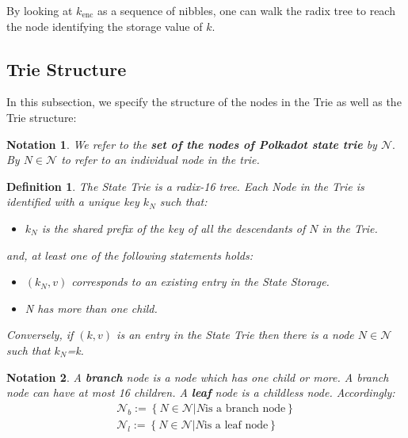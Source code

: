 \documentclass{book}
\newcommand{\assign}{:=}
\newcommand{\tmop}[1]{\ensuremath{\operatorname{#1}}}
\newcommand{\tmstrong}[1]{\textbf{#1}}
\newcommand{\tmtextbf}[1]{{\bfseries{#1}}}
\newcommand{\tmtexttt}[1]{{\ttfamily{#1}}}
\newcommand{\tmverbatim}[1]{{\ttfamily{#1}}}
\newenvironment{itemizeminus}{\begin{itemize} \renewcommand{\labelitemi}{$-$}\renewcommand{\labelitemii}{$-$}\renewcommand{\labelitemiii}{$-$}\renewcommand{\labelitemiv}{$-$}}{\end{itemize}}
\newtheorem{definition}{Definition}
\newtheorem{notation}{Notation}
\providecommand{\tmop}[1]{\ensuremath{\mathrm{#1}}}
\providecommand{\tmstrong}[1]{\tmtextbf{#1}}
\providecommand{\tmtextbf}[1]{\tmtextbf{#1}}
\providecommand{\tmverbatim}[1]{\tmtexttt{#1}}
\newtheorem{definition}{Definition}
\newtheorem{notation}{Notation}
\begin{document}
By looking at $k_{\tmop{enc}}$ as a sequence of nibbles, one can walk the
radix tree to reach the node identifying the storage value of $k$.

\subsection{Trie Structure}\label{sect-state-storage-trie-structure}

In this subsection, we specify the structure of the nodes in the Trie as well
as the Trie structure:

\begin{notation}
  We refer to the {\tmstrong{set of the nodes of Polkadot state trie}} by
  $\mathcal{N}.$ By $N \in \mathcal{N}$ to refer to an individual node in the
  trie.
\end{notation}

\begin{definition}
  \label{defn-nodetype}The State Trie is a radix-16 tree. Each Node in the
  Trie is identified with a unique key $k_N$ such that:
  \begin{itemizeminus}
    \item $k_N$ is the shared prefix of the key of all the descendants of $N$
    in the Trie.
  \end{itemizeminus}
  and, at least one of the following statements holds:
  \begin{itemizeminus}
    \item $(k_N, v)$ corresponds to an existing entry in the State Storage.
    
    \item N has more than one child.
  \end{itemizeminus}
  \tmverbatim{}Conversely, if $(k, v)$ is an entry in the State Trie then
  there is a node $N \in \mathcal{N}$ such that $k_N$=k.
\end{definition}

\begin{notation}
  A {\tmstrong{branch}} node is a node which has one child or more. A branch
  node can have at most 16 children. A {\tmstrong{leaf}} node is a childless
  node. Accordingly:
  \[ \begin{array}{c}
       \mathcal{N}_b \assign \left\{ N \in \mathcal{N}|N \text{is a branch
       node} \right\}\\
       \mathcal{N}_l \assign \left\{ N \in \mathcal{N}|N \text{is a leaf node}
       \right\}
     \end{array} \]
\end{notation}
\end{document}
